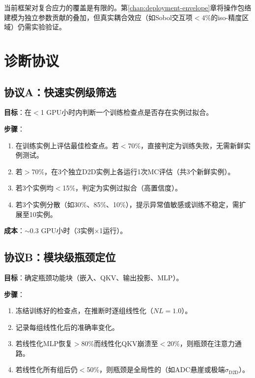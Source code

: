 当前框架对复合应力的覆盖是有限的。第\ref{chap:deployment-envelope}章将操作包络建模为独立参数贡献的叠加，但真实耦合效应（如Sobol交互项$<4\%$的iso-精度区域）仍需实验验证。


\section{诊断协议}
\label{sec:diagnostic_protocols}

\subsection{协议A：快速实例级筛选}
\label{subsec:protocol_a}

\textbf{目标}：在$<$1 GPU小时内判断一个训练检查点是否存在实例过拟合。

\textbf{步骤}：
\begin{enumerate}
    \item 在训练实例上评估最佳检查点。若$<$70\%，直接判定为训练失败，无需新鲜实例测试。
    \item 若$>$70\%，在3个独立D2D实例上各运行1次MC评估（共3个新鲜实例）。
    \item 若3个实例均$<$15\%，判定为实例过拟合（高置信度）。
    \item 若3个实例分散（如30\%、85\%、10\%），提示异常值敏感或训练不稳定，需扩展至10实例。
\end{enumerate}

\textbf{成本}：$\sim$0.3 GPU小时（3实例$\times$1运行）。

\subsection{协议B：模块级瓶颈定位}
\label{subsec:protocol_b}

\textbf{目标}：确定瓶颈功能块（嵌入、QKV、输出投影、MLP）。

\textbf{步骤}：
\begin{enumerate}
    \item 冻结训练好的检查点，在推断时逐组线性化（$NL=1.0$）。
    \item 记录每组线性化后的准确率变化。
    \item 若线性化MLP恢复$>$80\%而线性化QKV崩溃至$<$20\%，则瓶颈在注意力通路。
    \item 若线性化所有组后仍$<$50\%，则瓶颈是全局性的（如ADC悬崖或极端$\sigma_{\mathrm{D2D}}$）。
\end{enumerate}


